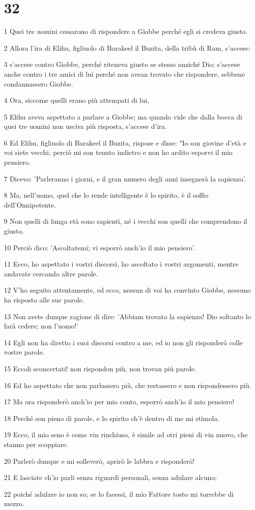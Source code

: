 \chapter{32}

\par 1 Quei tre uomini cessarono di rispondere a Giobbe perché egli si credeva giusto.
\par 2 Allora l'ira di Elihu, figliuolo di Barakeel il Buzita, della tribù di Ram, s'accese:
\par 3 s'accese contro Giobbe, perché riteneva giusto se stesso anziché Dio; s'accese anche contro i tre amici di lui perché non avean trovato che rispondere, sebbene condannassero Giobbe.
\par 4 Ora, siccome quelli erano più attempati di lui,
\par 5 Elihu aveva aspettato a parlare a Giobbe; ma quando vide che dalla bocca di quei tre uomini non usciva più risposta, s'accese d'ira.
\par 6 Ed Elihu, figliuolo di Barakeel il Buzita, rispose e disse: "Io son giovine d'età e voi siete vecchi; perciò mi son tenuto indietro e non ho ardito esporvi il mio pensiero.
\par 7 Dicevo: 'Parleranno i giorni, e il gran numero degli anni insegnerà la sapienza'.
\par 8 Ma, nell'uomo, quel che lo rende intelligente è lo spirito, è il soffio dell'Onnipotente.
\par 9 Non quelli di lunga età sono sapienti, né i vecchi son quelli che comprendono il giusto.
\par 10 Perciò dico: 'Ascoltatemi; vi esporrò anch'io il mio pensiero'.
\par 11 Ecco, ho aspettato i vostri discorsi, ho ascoltato i vostri argomenti, mentre andavate cercando altre parole.
\par 12 V'ho seguito attentamente, ed ecco, nessun di voi ha convinto Giobbe, nessuno ha risposto alle sue parole.
\par 13 Non avete dunque ragione di dire: 'Abbiam trovato la sapienza! Dio soltanto lo farà cedere; non l'uomo!'
\par 14 Egli non ha diretto i suoi discorsi contro a me, ed io non gli risponderò colle vostre parole.
\par 15 Eccoli sconcertati! non rispondon più, non trovan più parole.
\par 16 Ed ho aspettato che non parlassero più, che restassero e non rispondessero più.
\par 17 Ma ora risponderò anch'io per mio conto, esporrò anch'io il mio pensiero!
\par 18 Perché son pieno di parole, e lo spirito ch'è dentro di me mi stimola.
\par 19 Ecco, il mio seno è come vin rinchiuso, è simile ad otri pieni di vin nuovo, che stanno per scoppiare.
\par 20 Parlerò dunque e mi solleverò, aprirò le labbra e risponderò!
\par 21 E lasciate ch'io parli senza riguardi personali, senza adulare alcuno;
\par 22 poiché adulare io non so; se lo facessi, il mio Fattore tosto mi torrebbe di mezzo.

